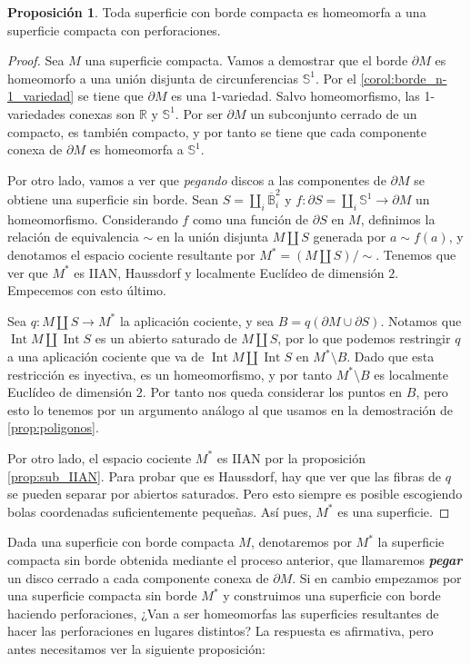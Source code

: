 \documentclass[10pt]{report}
\newcommand{\R}{\mathbb{R}}
\DeclareMathOperator{\interior}{Int} %
\newcommand{\enfatiza}[1]{\textbf{\textit{#1}}}
\theoremstyle{definition}
\newtheorem{prop}[defin]{Proposición}
\begin{document}
\begin{prop}\label{prop:borde_perforaciones}
Toda superficie con borde compacta es homeomorfa a una superficie compacta con perforaciones.
\end{prop}
\begin{proof}
Sea $M$ una superficie compacta. Vamos a demostrar que el borde $\partial M$ es homeomorfo a una unión disjunta de circunferencias $\mathbb{S}^1$. Por el \autoref{corol:borde_n-1_variedad} se tiene que $\partial M$ es una 1-variedad. Salvo homeomorfismo, las 1-variedades conexas son $\R$ y $\mathbb{S}^1$. Por ser $\partial M$ un subconjunto cerrado de un compacto, es también compacto, y por tanto se tiene que cada componente conexa de $\partial M$ es homeomorfa a $\mathbb{S}^1$.

Por otro lado, vamos a ver que \textit{pegando} discos a las componentes de $\partial M$ se obtiene una superficie sin borde. Sean $S=\amalg_i \overline{\mathbb{B}}_i^2$ y $f:\partial S=\amalg_i \mathbb{S}^1\to \partial M$ un homeomorfismo. Considerando $f$ como una función de $\partial S$ en $M$, definimos la relación de equivalencia $\sim$ en la unión disjunta $M\amalg S$ generada por $a\sim f(a)$, y denotamos el espacio cociente resultante por $M^*=(M\amalg S)/\sim$. Tenemos que ver que $M^*$ es IIAN, Haussdorf y localmente Euclídeo de dimensión $2$. Empecemos con esto último. 

Sea $q:M\amalg S\to M^*$ la aplicación cociente, y sea $B=q(\partial M\cup \partial S)$. Notamos que $\interior M\amalg \interior S$ es un abierto saturado de $M\amalg S$, por lo que podemos restringir $q$ a una aplicación cociente que va de $\interior M\amalg \interior S$ en $M^*\setminus B$. Dado que esta restricción es inyectiva, es un homeomorfismo, y por tanto $M^*\setminus B$ es localmente Euclídeo de dimensión $2$. Por tanto nos queda considerar los puntos en $B$, pero esto lo tenemos por un argumento análogo al que usamos en la demostración de \autoref{prop:poligonos}. 

Por otro lado, el espacio cociente $M^*$ es IIAN por la proposición \autoref{prop:sub_IIAN}. Para probar que es Haussdorf, hay que ver que las fibras de $q$ se pueden separar por abiertos saturados. Pero esto siempre es posible escogiendo bolas coordenadas suficientemente pequeñas. Así pues, $M^*$ es una superficie. 
\end{proof}

Dada una superficie con borde compacta $M$, denotaremos por $M^*$ la superficie compacta sin borde obtenida mediante el proceso anterior, que llamaremos \enfatiza{pegar} un disco cerrado a cada componente conexa de $\partial M$. Si en cambio empezamos por una superficie compacta sin borde $M^*$ y construimos una superficie con borde haciendo perforaciones, ¿Van a ser homeomorfas las superficies resultantes de hacer las perforaciones en lugares distintos? La respuesta es afirmativa, pero antes necesitamos ver la siguiente proposición:
\end{document}
